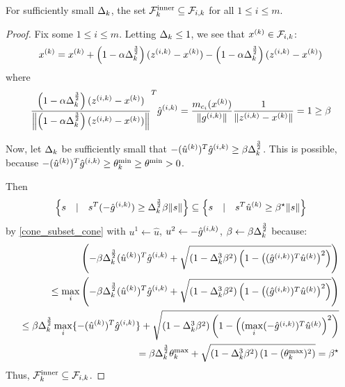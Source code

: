 \begin{theorem}
For sufficiently small $\Delta_k$, the set ${\mathcal {F}^{\text{inner}}_k} \subseteq {\mathcal F_{i, k}}$ for all $1\le i \le m$.
\end{theorem}


\begin{proof}
Fix some $1\le i \le m$.
Letting $\Delta_k \le 1$, we see that ${x^{(k)}} \in {\mathcal F_{i, k}}$:
\begin{align*}
{x^{(k)}} = {x^{(k)}} + \left(1 - \alpha\Delta_k^{\frac 3 2}\right)({z^{(i, k)}} - {x^{(k)}}) - \left(1 - \alpha\Delta_k^{\frac 3 2}\right)({z^{(i, k)}} - {x^{(k)}}) \\
\end{align*}
where
\begin{align*}
\frac{\left(1 - \alpha\Delta_k^{\frac 3 2}\right)({z^{(i, k)}} - {x^{(k)}})}{\left\|\left(1 - \alpha\Delta_k^{\frac 3 2}\right)({z^{(i, k)}} - {x^{(k)}})\right\|}^T{{\hat g}^{(i, k)}} =
\frac{m_{c_i}({x^{(k)}})}{\|{g^{(i, k)}}\|}\frac{1}{\|{z^{(i, k)}} - {x^{(k)}}\|} = 1 \ge \beta\\
\end{align*}


Now, let $\Delta_k$ be sufficiently small that $-({{\hat u}^{(k)}})^T{{\hat g}^{(i, k)}} \ge \beta\Delta_k^{\frac 3 2}$.
This is possible, because $ -({{\hat u}^{(k)}})^T{{\hat g}^{(i, k)}} \ge \theta^{\text{min}}_k \ge \theta^{\text{min}} > 0$.

Then
\begin{align*}
\left\{s\quad | \quad s^T(-{{\hat g}^{(i, k)}})\ge\Delta_k^{\frac 3 2}\beta\|s\| \right\}  \subseteq \left\{s\quad | \quad s^T{{\hat u}^{(k)}}\ge\beta^{\star}\|s\| \right\}
\end{align*}
by \cref{cone_subset_cone} with $u^1 \gets \hat u$, $u^2 \gets -{{\hat g}^{(i, k)}}$, $\beta \gets \beta \Delta_k^{\frac 3 2 }$ because:
\begin{align*}
\left(-\beta\Delta_k^{\frac 3 2}({{\hat u}^{(k)}})^T{{\hat g}^{(i, k)}} + \sqrt{(1 - \Delta_k^3\beta^2)\left(1 - \left(({{\hat g}^{(i, k)}})^T\hat u^{(k)}\right)^2\right)}\right) \\
\le \max_i \left(-\beta\Delta_k^{\frac 3 2}({{\hat u}^{(k)}})^T{{{\hat g}^{(i, k)}}} + \sqrt{(1 - \Delta_k^3\beta^2)\left(1 - \left(({{\hat g}^{(i, k)}})^T{{\hat u}^{(k)}}\right)^2\right)}\right) \\
\le \beta\Delta_k^{\frac 3 2} \max_i\{-({{\hat u}^{(k)}})^T{{\hat g}^{(i, k)}}\} + \sqrt{(1 - \Delta_k^3\beta^2)\left(1 - \left((\max_i(-{{\hat g}^{(i, k)}})^T{{\hat u}^{(k)}}\right)^2\right)} \\
= \beta\Delta_k^{\frac 3 2} \theta^{\text{max}}_k + \sqrt{(1 - \Delta_k^3\beta^2)\left(1 - (\theta^{\text{max}}_k) ^2\right)} = \beta^{\star}
\end{align*}
Thus, ${\mathcal {F}^{\text{inner}}_k} \subseteq {\mathcal F_{i, k}}$.
\end{proof}

